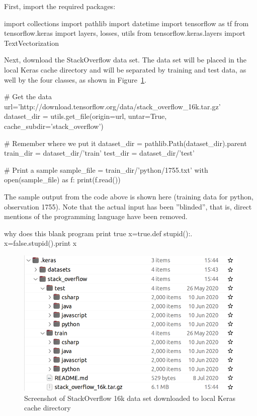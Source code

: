 First, import the required packages:

\begin{samepage}
\begin{pythoncode}
import collections
import pathlib
import datetime
import tensorflow as tf
from tensorflow.keras import layers, losses, utils
from tensorflow.keras.layers import TextVectorization
\end{pythoncode}
\end{samepage}

Next, download the StackOverflow data set. The data set will be placed in the local Keras cache directory and will be separated by training and test data, as well by the four classes, as shown in Figure~\ref{fig:screen9_chap16}.

\begin{samepage}
\begin{pythoncode}
# Get the data
url='http://download.tensorflow.org/data/stack_overflow_16k.tar.gz'
dataset_dir = utils.get_file(origin=url, untar=True,
        cache_subdir='stack_overflow')

# Remember where we put it
dataset_dir = pathlib.Path(dataset_dir).parent
train_dir = dataset_dir/'train'
test_dir = dataset_dir/'test'

# Print a sample
sample_file = train_dir/'python/1755.txt'
with open(sample_file) as f:
  print(f.read())
\end{pythoncode}
\end{samepage}

The sample output from the code above is shown here (training data for python, observation 1755). Note that the actual input has been ''blinded'', that is, direct mentions of the programming language have been removed.

\begin{samepage}
\begin{textcode}
why does this blank program print true x=true.def stupid():.
x=false.stupid().print x
\end{textcode}
\end{samepage}

\begin{figure}
\centering

\includegraphics[width=.75\textwidth]{screen9.png}
\caption[StackOverflow dataset in Keras cache directory]{Screenshot of StackOverflow 16k data set downloaded to local Keras cache directory}
\label{fig:screen9_chap16}
\end{figure}

